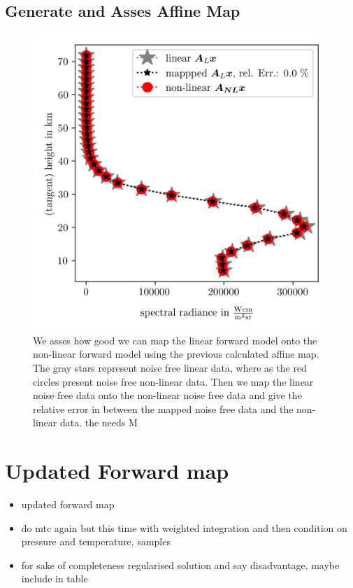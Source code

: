 \subsection{Generate and Asses Affine Map}
\begin{figure}[ht!]
	\centering
	\includegraphics{SampMapAssesment.png}
	\caption[Assessment of affine map.]{We asses how good we can map the linear forward model onto the non-linear forward model using the previous calculated affine map. The gray stars represent noise free linear data, where as the red circles present noise free non-linear data. Then we map the linear noise free data onto the non-linear noise free data and give the relative error in between the mapped noise free data and the non-linear data. the  needs M  }
	\label{fig:MapAsses}
\end{figure}


\section{Updated Forward map}

\begin{itemize}
	\item updated forward map
	\item do mtc again but this time with weighted integration and then condition on pressure and temperature, samples
	\item for sake of completeness regularised solution and say disadvantage, maybe include in table
\end{itemize}


